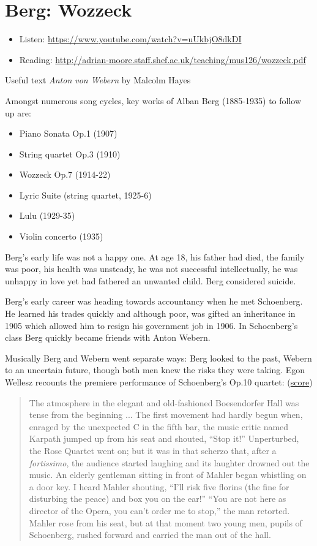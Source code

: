 \section{Berg: Wozzeck}
\begin{itemize}
\item Listen: \url{https://www.youtube.com/watch?v=uUkbjO8dkDI}
\item Reading: \url{http://adrian-moore.staff.shef.ac.uk/teaching/mus126/wozzeck.pdf}
\end{itemize}

Useful text \textit{Anton von Webern} by Malcolm Hayes \citeyearpar{hayes1995anton}

Amongst numerous song cycles, key works of Alban Berg (1885-1935) to follow up are:
\begin{itemize}
\item Piano Sonata Op.1 (1907)
\item String quartet Op.3 (1910)
\item Wozzeck Op.7 (1914-22)
\item Lyric Suite (string quartet, 1925-6)
\item Lulu (1929-35)
\item Violin concerto (1935) 
\end{itemize}

Berg's early life was not a happy one. At age 18, his father had died, the family was poor, his health was unsteady, he was not successful intellectually, he was unhappy in love yet had fathered an unwanted child. Berg considered suicide. 

Berg's early career was heading towards accountancy when he met Schoenberg. He learned his trades quickly and although poor, was gifted an inheritance in 1905 which allowed him to resign his government job in 1906. In Schoenberg's class Berg quickly became friends with Anton Webern.

Musically Berg and Webern went separate ways: Berg looked to the past, Webern to an uncertain future, though both men knew the risks they were taking. Egon Wellesz recounts the premiere performance of Schoenberg's Op.10 quartet: (\href{http://conquest.imslp.info/files/imglnks/usimg/c/c1/IMSLP29725-PMLP66179-Schoenberg_-_SQ_No._2_score.pdf}{score})

\begin{quotation}
The atmosphere in the elegant and old-fashioned Boesendorfer Hall was tense from the beginning ... The first 
movement had hardly begun when, enraged by the unexpected C in the fifth bar, the music critic named Karpath 
jumped up from his seat and shouted, ``Stop it!'' Unperturbed, the Rose Quartet went on; but it was in that 
scherzo that, after a \textit{fortissimo}, the audience started laughing and its laughter drowned out the 
music. An elderly gentleman sitting in front of Mahler began whistling on a door key. I heard Mahler 
shouting, ``I'll risk five florins (the fine for disturbing the peace) and box you on the ear!'' ``You are 
not here as director of the Opera, you can't order me to stop,'' the man retorted. Mahler rose from his seat, 
but at that moment two young men, pupils of Schoenberg, rushed forward and carried the man out of the hall.
\citep[p32]{monson1979alban}
\end{quotation} 

